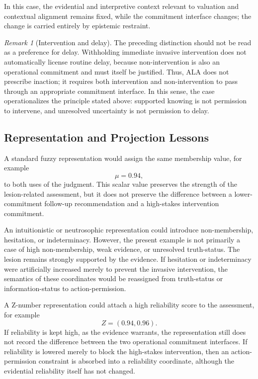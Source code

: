 \documentclass[reqno,final]{amsart}
\theoremstyle{definition}
\theoremstyle{plain}
\theoremstyle{remark}
\newtheorem{remark}{Remark}
\begin{document}
In this case, the evidential and interpretive context relevant to valuation and contextual alignment remains fixed, while the commitment interface changes; the change is carried entirely by epistemic restraint.

\begin{remark}[Intervention and delay]
The preceding distinction should not be read as a preference for delay. 
Withholding immediate invasive intervention does not automatically 
license routine delay, because non-intervention is also an operational 
commitment and must itself be justified. Thus, ALA does not prescribe 
inaction; it requires both intervention and non-intervention to pass 
through an appropriate commitment interface. In this sense, the case 
operationalizes the principle stated above: supported knowing is not 
permission to intervene, and unresolved uncertainty is not permission 
to delay.
\end{remark}

\subsection{Representation and Projection Lessons}
\label{subsec:case-semantic-reassignment}

A standard fuzzy representation would assign the same membership value, for example
\[
\mu=0.94,
\]
to both uses of the judgment. This scalar value preserves the strength of the lesion-related assessment, but it does not preserve the difference between a lower-commitment follow-up recommendation and a high-stakes intervention commitment.

An intuitionistic or neutrosophic representation could introduce non-membership, hesitation, or indeterminacy. However, the present example is not primarily a case of high non-membership, weak evidence, or unresolved truth-status. The lesion remains strongly supported by the evidence. If hesitation or indeterminacy were artificially increased merely to prevent the invasive intervention, the semantics of these coordinates would be reassigned from truth-status or information-status to action-permission.

A Z-number representation could attach a high reliability score to the assessment, for example
\[
Z=(0.94,0.96).
\]
If reliability is kept high, as the evidence warrants, the representation still does not record the difference between the two operational commitment interfaces. If reliability is lowered merely to block the high-stakes intervention, then an action-permission constraint is absorbed into a reliability coordinate, although the evidential reliability itself has not changed.
\end{document}
